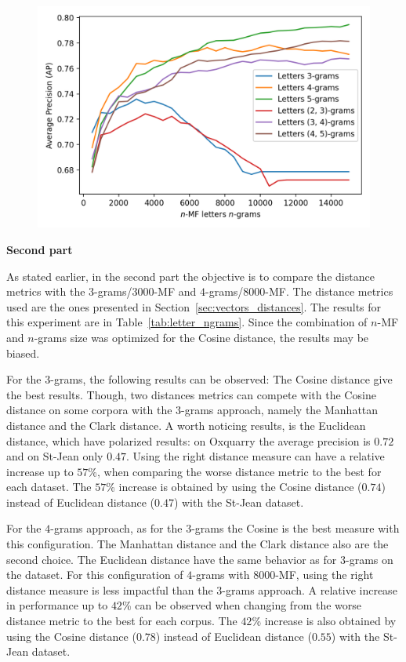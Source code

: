 \begin{figure}
  \label{fig:letter_ngrams_st_jean}
  \includegraphics[width=\linewidth]{img/letter_ngrams_st_jean.png}
\end{figure}

\textbf{Second part}

As stated earlier, in the second part the objective is to compare the distance metrics with the $3$-grams/$3000$-MF and $4$-grams/$8000$-MF.
The distance metrics used are the ones presented in Section~\ref{sec:vectors_distances}.
The results for this experiment are in Table~\ref{tab:letter_ngrams}.
Since the combination of $n$-MF and $n$-grams size was optimized for the Cosine distance, the results may be biased.

For the $3$-grams, the following results can be observed:
The Cosine distance give the best results.
Though, two distances metrics can compete with the Cosine distance on some corpora with the $3$-grams approach, namely the Manhattan distance and the Clark distance.
A worth noticing results, is the Euclidean distance, which have polarized results: on Oxquarry the average precision is $0.72$ and on St-Jean only $0.47$.
Using the right distance measure can have a relative increase up to $57$\%, when comparing the worse distance metric to the best for each dataset.
The $57$\% increase is obtained by using the Cosine distance ($0.74$) instead of Euclidean distance ($0.47$) with the St-Jean dataset.

For the $4$-grams approach, as for the $3$-grams the Cosine is the best measure with this configuration.
The Manhattan distance and the Clark distance also are the second choice.
The Euclidean distance have the same behavior as for $3$-grams on the dataset.
For this configuration of $4$-grams with $8000$-MF, using the right distance measure is less impactful than the $3$-grams approach.
A relative increase in performance up to $42$\% can be observed when changing from the worse distance metric to the best for each corpus.
The $42$\% increase is also obtained by using the Cosine distance ($0.78$) instead of Euclidean distance ($0.55$) with the St-Jean dataset.

